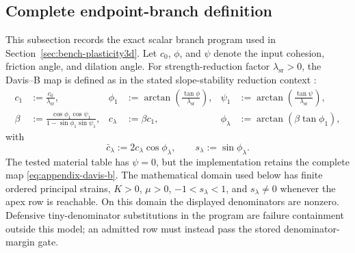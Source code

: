 \label{sec:solver-evidence}

\subsection{Complete endpoint-branch definition}
\label{subsec:mc-branch-definition}

This subsection records the exact scalar branch program used in
Section~\ref{sec:bench-plasticity3d}. Let $c_0$, $\phi$, and $\psi$ denote the
input cohesion, friction angle, and dilation angle. For strength-reduction
factor $\lambda_{\mathrm{sr}}>0$, the Davis--B map is
defined as in the stated slope-stability reduction context
\citep{davis1968plasticity,tschuchnigg2015nonassociated,sysala2021optimization}:
\begin{align}
  c_1&:=\frac{c_0}{\lambda_{\mathrm{sr}}},
  &
  \phi_1&:=\arctan\!\left(
      \frac{\tan\phi}{\lambda_{\mathrm{sr}}}\right),
  &
  \psi_1&:=\arctan\!\left(
      \frac{\tan\psi}{\lambda_{\mathrm{sr}}}\right),
  \nonumber\\
  \beta&:=\frac{\cos\phi_1\cos\psi_1}
                 {1-\sin\phi_1\sin\psi_1},
  &
  c_\lambda&:=\beta c_1,
  &
  \phi_\lambda&:=\arctan(\beta\tan\phi_1),
  \label{eq:appendix-davis-b}
\end{align}
with
\begin{equation}
  \bar c_\lambda:=2c_\lambda\cos\phi_\lambda,
  \qquad s_\lambda:=\sin\phi_\lambda.
  \label{eq:appendix-reduced-parameters}
\end{equation}
The tested material table has $\psi=0$, but the implementation retains the
complete map \eqref{eq:appendix-davis-b}.
The mathematical domain used below has finite ordered principal strains,
$K>0$, $\mu>0$, $-1<s_\lambda<1$, and $s_\lambda\ne0$ whenever the apex row is
reachable. On this domain the displayed denominators are nonzero. Defensive
tiny-denominator substitutions in the program are failure containment outside
this model; an admitted row must instead pass the stored denominator-margin
gate.

